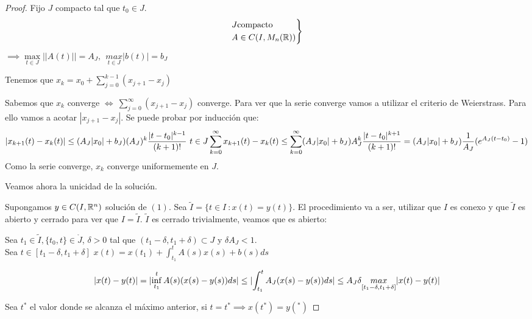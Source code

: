 \begin{proof}

  Fijo $J$ compacto tal que $t_0 \in J$.\\
\[
  \begin{rcases}
    J \text{compacto}\\
    A \in C ( I, M_n (\mathbb{R}))
  \end{rcases}
\]
  $\implies \underset{t \in J}{\max} || A(t) || = A_J , \ \ \underset{t \in J}{max} |b(t)| = b_J $

  Tenemos que $x_k = x_0 + \sum_{j=0}^{k-1} (x_{j+1} - x_j)$

  Sabemos que $x_k$ converge $\iff \ \sum_{j=0}^{\infty} (x_{j+1} - x_j )$ converge. Para ver que la serie converge vamos a utilizar el criterio de Weierstrass. Para ello vamos a acotar $|x_{j+1} - x_j |$. Se puede probar por inducción que:
  \[
  |x_{k+1} (t) - x_k (t) | \leq (A_J |x_0| + b_J) (A_J )^k \frac{|t-t_0| ^{k-1}}{(k+1)!} \ t \in J\\
  \sum_{k=0}^{\infty} x_{k+1} (t) - x_k (t) \leq \sum_{k=0} ^{\infty} (A_J |x_0| + b_J) A_J ^k \frac{|t-t_0|^{k+1}}{(k+1)!} = (A_J |x_0| + b_J) \frac{1}{A_J} (e^{A_J (t-t_0)}-1)
  \]
  Como la serie converge, $x_k$ converge uniformemente en $J$.

  Veamos ahora la unicidad de la solución.

  Supongamos $y \in C(I,\mathbb{R} ^n)$ solución de $(1)$. Sea $\tilde{I} = \{ t \in I \ : x(t) = y(t) \}$. El procedimiento va a ser, utilizar que $I$ es conexo y que $\tilde{I}$ es abierto y cerrado para ver que $I=\tilde{I}$. $\widetilde{I}$ es cerrado trivialmente, veamos que es abierto:

  Sea $t_1 \in \tilde{I}, \{t_0 , t\} \in \mathring{J}$, $\delta > 0$ tal que $(t_1 - \delta , t_1 + \delta ) \subset J$ y $\delta A_J < 1$.\\
  Sea $t \in [t_1 - \delta, t_1 + \delta]$ $x(t) = x(t_1 ) + \int_{t_1} ^{t} A(s)x(s)+b(s) ds$

  \[
  |x(t) - y(t)| = \lvert\inf _{t_1} ^t A(s)(x(s) - y(s)) ds\rvert \leq \lvert\int _{t_1} ^t A_J (x(s) - y(s)) ds\rvert \leq A_J \delta \underset{[t_1 - \delta , t_1 + \delta]}{max} |x(t) - y(t)| 
  \]

  Sea $t^*$ el valor donde se alcanza el máximo anterior, si $t=t^* \implies x(t^*) = y(^*)$

  
\end{proof}
